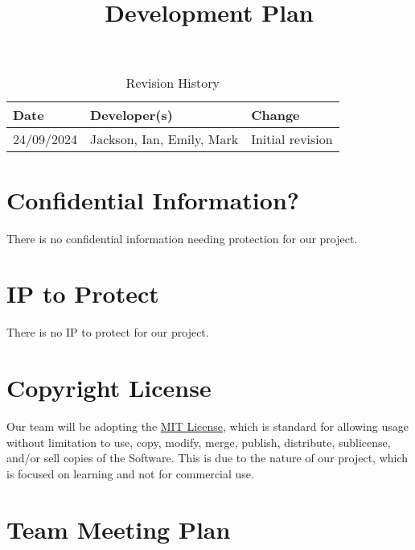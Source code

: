 \documentclass{article}
\title{Development Plan\\\progname}
\author{\authname}
\date{}
\begin{document}
\maketitle

\begin{table}[hp]
\caption{Revision History} \label{TblRevisionHistory}
\begin{tabularx}{\textwidth}{llX}
\toprule
\textbf{Date} & \textbf{Developer(s)} & \textbf{Change}\\
\midrule
24/09/2024 & Jackson, Ian, Emily, Mark & Initial revision\\
\bottomrule
\end{tabularx}
\end{table}

\newpage{}



\section{Confidential Information?}

There is no confidential information needing protection for our project.

\section{IP to Protect}

There is no IP to protect for our project.

\section{Copyright License}

Our team will be adopting the \href{https://github.com/emilyperica/ScoreGen/blob/main/LICENSE}{MIT License}, which is standard for allowing usage without limitation
to use, copy, modify, merge, publish, distribute, sublicense, and/or sell
copies of the Software. This is due to the nature of our project, which is focused on learning and not for commercial use.

\section{Team Meeting Plan}
\end{document}
